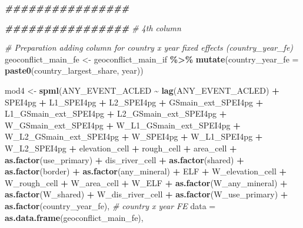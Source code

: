 \documentclass[
  a4paper,
]{article}
\newenvironment{Shaded}{\begin{snugshade}}{\end{snugshade}}
\newcommand{\AttributeTok}[1]{\textcolor[rgb]{0.13,0.29,0.53}{#1}}
\newcommand{\CommentTok}[1]{\textcolor[rgb]{0.56,0.35,0.01}{\textit{#1}}}
\newcommand{\DocumentationTok}[1]{\textcolor[rgb]{0.56,0.35,0.01}{\textbf{\textit{#1}}}}
\newcommand{\FunctionTok}[1]{\textcolor[rgb]{0.13,0.29,0.53}{\textbf{#1}}}
\newcommand{\NormalTok}[1]{#1}
\newcommand{\OtherTok}[1]{\textcolor[rgb]{0.56,0.35,0.01}{#1}}
\newcommand{\SpecialCharTok}[1]{\textcolor[rgb]{0.81,0.36,0.00}{\textbf{#1}}}
\begin{document}
\begin{Shaded}
\begin{Highlighting}[]
\DocumentationTok{\#\#\#\#\#\#\#\#\#\#\#\#\#\#\#\#}



\DocumentationTok{\#\#\#\#\#\#\#\#\#\#\#\#\#\#\#\#}
\CommentTok{\# 4th column }

\CommentTok{\# Preparation adding column for country x year fixed effects (country\_year\_fe)}
\NormalTok{geoconflict\_main\_fe }\OtherTok{\textless{}{-}}\NormalTok{ geoconflict\_main\_if }\SpecialCharTok{\%\textgreater{}\%} 
  \FunctionTok{mutate}\NormalTok{(}\AttributeTok{country\_year\_fe =} \FunctionTok{paste0}\NormalTok{(country\_largest\_share, year))}

\NormalTok{mod4 }\OtherTok{\textless{}{-}} \FunctionTok{spml}\NormalTok{(ANY\_EVENT\_ACLED }\SpecialCharTok{\textasciitilde{}} \FunctionTok{lag}\NormalTok{(ANY\_EVENT\_ACLED) }\SpecialCharTok{+}\NormalTok{ SPEI4pg }\SpecialCharTok{+}\NormalTok{ L1\_SPEI4pg }\SpecialCharTok{+}\NormalTok{ L2\_SPEI4pg }\SpecialCharTok{+}\NormalTok{ GSmain\_ext\_SPEI4pg }\SpecialCharTok{+}\NormalTok{ L1\_GSmain\_ext\_SPEI4pg }\SpecialCharTok{+}\NormalTok{ L2\_GSmain\_ext\_SPEI4pg }\SpecialCharTok{+}\NormalTok{ W\_GSmain\_ext\_SPEI4pg }\SpecialCharTok{+}\NormalTok{ W\_L1\_GSmain\_ext\_SPEI4pg }\SpecialCharTok{+}\NormalTok{ W\_L2\_GSmain\_ext\_SPEI4pg }\SpecialCharTok{+}\NormalTok{ W\_SPEI4pg }\SpecialCharTok{+}\NormalTok{ W\_L1\_SPEI4pg }\SpecialCharTok{+}\NormalTok{ W\_L2\_SPEI4pg }\SpecialCharTok{+}\NormalTok{ elevation\_cell }\SpecialCharTok{+}\NormalTok{ rough\_cell }\SpecialCharTok{+}\NormalTok{ area\_cell }\SpecialCharTok{+} \FunctionTok{as.factor}\NormalTok{(use\_primary) }\SpecialCharTok{+}\NormalTok{ dis\_river\_cell }\SpecialCharTok{+} \FunctionTok{as.factor}\NormalTok{(shared) }\SpecialCharTok{+}  \FunctionTok{as.factor}\NormalTok{(border) }\SpecialCharTok{+} \FunctionTok{as.factor}\NormalTok{(any\_mineral) }\SpecialCharTok{+}
\NormalTok{                              ELF }\SpecialCharTok{+}\NormalTok{ W\_elevation\_cell }\SpecialCharTok{+}\NormalTok{ W\_rough\_cell }\SpecialCharTok{+}\NormalTok{ W\_area\_cell }\SpecialCharTok{+}\NormalTok{ W\_ELF }\SpecialCharTok{+} \FunctionTok{as.factor}\NormalTok{(W\_any\_mineral) }\SpecialCharTok{+} \FunctionTok{as.factor}\NormalTok{(W\_shared)  }\SpecialCharTok{+} 
\NormalTok{                              W\_dis\_river\_cell }\SpecialCharTok{+} \FunctionTok{as.factor}\NormalTok{(W\_use\_primary) }\SpecialCharTok{+} \FunctionTok{as.factor}\NormalTok{(country\_year\_fe), }\CommentTok{\# country x year FE}
                             \AttributeTok{data =} \FunctionTok{as.data.frame}\NormalTok{(geoconflict\_main\_fe), }

\end{Highlighting}
\end{Shaded}
\end{document}
